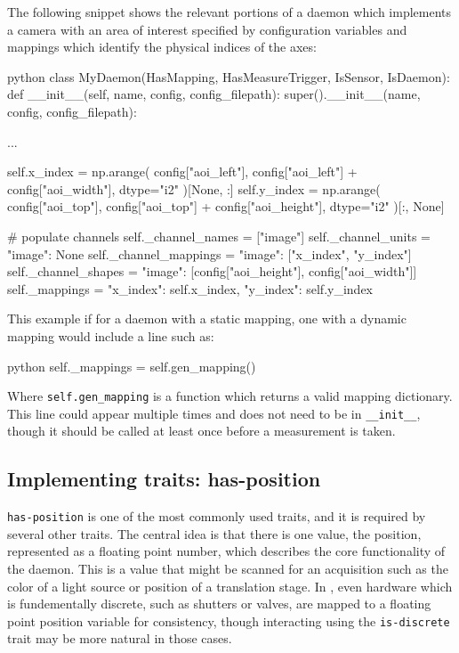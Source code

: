 The following snippet shows the relevant portions of a daemon which implements a camera with an area of interest specified by configuration variables and mappings which identify the physical indices of the axes:

\begin{codefragment}{python}
class MyDaemon(HasMapping, HasMeasureTrigger, IsSensor, IsDaemon):
    def __init__(self, name, config, config_filepath):
        super().__init__(name, config, config_filepath):

	...

	self.x_index = np.arange(
            config["aoi_left"], config["aoi_left"] + config["aoi_width"], dtype="i2"
        )[None, :]
        self.y_index = np.arange(
            config["aoi_top"], config["aoi_top"] + config["aoi_height"], dtype="i2"
        )[:, None]

        # populate channels
        self._channel_names = ["image"]
        self._channel_units = {"image": None}
        self._channel_mappings = {"image": ["x_index", "y_index"]}
        self._channel_shapes = {"image": [config["aoi_height"], config["aoi_width"]]}
        self._mappings = {"x_index": self.x_index, "y_index": self.y_index}
\end{codefragment}


This example if for a daemon with a static mapping, one with a dynamic mapping would include a line such as:


\begin{codefragment}{python}
	self._mappings = self.gen_mapping()
\end{codefragment}

Where \texttt{self.gen\_mapping} is a function which returns a valid mapping dictionary.
This line could appear multiple times and does not need to be in \texttt{\_\_init\_\_}, though it should be called at least once before a measurement is taken.



\subsection{Implementing traits: has-position}

\texttt{has-position} is one of the most commonly used traits, and it is required by several other traits.
The central idea is that there is one value, the position, represented as a floating point number, which describes the core functionality of the daemon.
This is a value that might be scanned for an acquisition such as the color of a light source or position of a translation stage.
In \yaq{}, even hardware which is fundementally discrete, such as shutters or valves, are mapped to a floating point position variable for consistency, though interacting using the \texttt{is-discrete} trait may be more natural in those cases.


